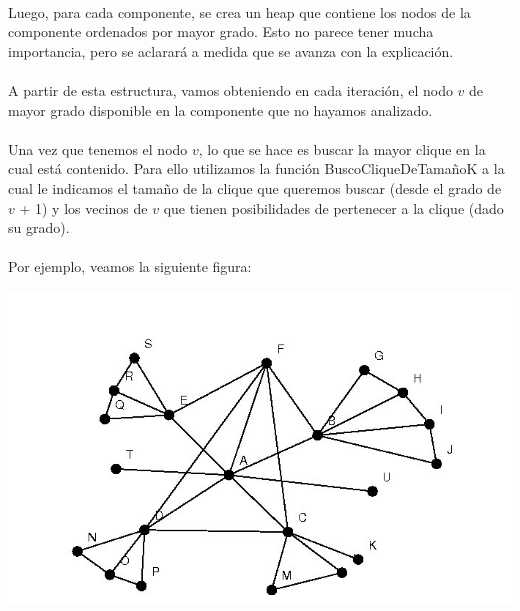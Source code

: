 \paragraph{}
Luego, para cada componente, se crea un heap que contiene los nodos de la componente ordenados por mayor grado. Esto no parece tener mucha importancia, pero se aclarará a medida que se avanza con la explicación.

\paragraph{}
A partir de esta estructura, vamos obteniendo en cada iteración, el nodo $v$ de mayor grado disponible en la componente que no hayamos analizado.

\paragraph{}
Una vez que tenemos el nodo $v$, lo que se hace es buscar la mayor clique en la cual está contenido. Para ello utilizamos la función BuscoCliqueDeTamañoK a la cual le indicamos el tamaño de la clique que queremos buscar (desde el grado de $v$ + 1) y los vecinos de $v$ que tienen posibilidades de pertenecer a la clique (dado su grado).

\paragraph{}
Por ejemplo, veamos la siguiente figura:

\includegraphics[scale = 0.9]{./p.jpg} \\

